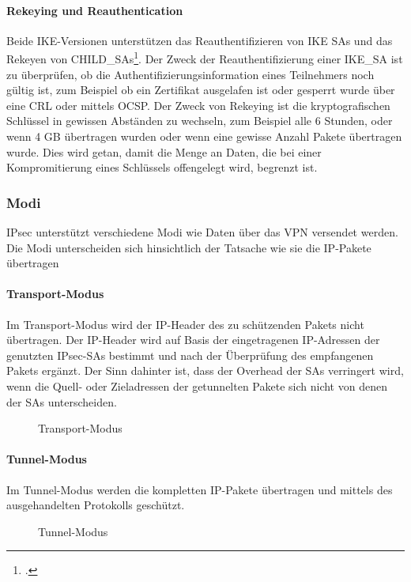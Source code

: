 \paragraph{Rekeying und Reauthentication}
Beide IKE-Versionen unterstützen das Reauthentifizieren von IKE SAs und das Rekeyen
von CHILD\_SAs\footcite[][616]{charlie_kaufman_rfc_2014}.
Der Zweck der Reauthentifizierung einer IKE\_SA ist zu überprüfen, ob die Authentifizierungsinformation
eines Teilnehmers noch gültig ist, zum Beispiel ob ein Zertifikat ausgelafen ist oder gesperrt
wurde über eine \ac{CRL} oder mittels \ac{OCSP}.
Der Zweck von Rekeying ist die kryptografischen Schlüssel in gewissen Abständen zu wechseln,
zum Beispiel alle 6 Stunden, oder wenn 4 GB übertragen wurden oder wenn eine gewisse Anzahl
Pakete übertragen wurde. Dies wird getan, damit die Menge an Daten, die bei einer Kompromitierung
eines Schlüssels offengelegt wird, begrenzt ist.


\subsubsection{Modi}
\ac{IPsec} unterstützt verschiedene Modi wie Daten über das VPN versendet werden.
Die Modi unterscheiden sich hinsichtlich der Tatsache wie sie die \ac{IP}-Pakete übertragen
\paragraph{Transport-Modus}
Im Transport-Modus wird der \ac{IP}-Header des zu schützenden Pakets nicht übertragen.
Der IP-Header wird auf Basis der eingetragenen IP-Adressen der genutzten \ac{IPsec}-\acp{SA}
bestimmt und nach der Überprüfung des empfangenen Pakets ergänzt. Der Sinn dahinter ist, dass
der Overhead der \acp{SA} verringert wird, wenn die Quell- oder Zieladressen der getunnelten Pakete
sich nicht von denen der \acp{SA} unterscheiden.
\begin{figure}
    \caption{Transport-Modus}
    \label{fig:Transport-Modus}
    \centering
    \def\svgwidth{\columnwidth}
    
\end{figure}

\paragraph{Tunnel-Modus}
Im Tunnel-Modus werden die kompletten \ac{IP}-Pakete übertragen und mittels des ausgehandelten
Protokolls geschützt.

\begin{figure}
    \caption{Tunnel-Modus}
    \label{fig:Tunnel-Modus}
    \centering
    \def\svgwidth{\columnwidth}
    
\end{figure}

